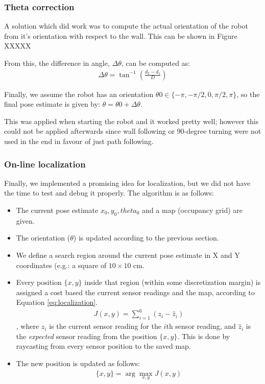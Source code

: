 \subsubsection{Theta correction}
A solution which did work was to compute the actual orientation of the robot from it's orientation with respect to the wall. This can be shown in Figure XXXXX


From this, the difference in angle, $\Delta\theta$, can be computed as:
\begin{align}
\label{eq:locTheta}
\Delta\theta = \tan^{-1}\left(\frac{d_2 - d_1}{D}\right)
\end{align}

Finally, we assume the robot has an orientation $\theta0 \in \{-\pi, -\pi/2, 0, \pi/2, \pi\}$, so the final pose estimate is given by: $\theta = \theta0 + \Delta\theta$.

This was applied when starting the robot and it worked pretty well; however this could not be applied afterwards since wall following or 90-degree turning were not used in the end in favour of just path following.  

\subsubsection{On-line localization}
Finally, we implemented a promising idea for localization, but we did not have the time to test and debug it properly. The algorithm is as follows:

\begin{itemize}
\item The current pose estimate ${x_0, y_0, theta_0}$ and a map (occupancy grid) are given.

\item The orientation ($\theta$) is updated according to the previous section.

\item We define a search region around the current pose estimate in X and Y coordinates (e.g.: a square of $10\times10$ cm.
\item Every position $\{x,y\}$ inside that region (within some discretization margin) is assigned a cost based the current sensor readings and the map, according to Equation \ref{eq:localization}.
\begin{align}
\label{eq:localization}
J(x,y) = \sum_{i = 1}^6 (z_i - \hat{z}_i)
\end{align}
, where $z_i$ is the current sensor reading for the $i$th sensor reading, and $\hat{z}_i$ is the \emph{expected} sensor reading from the position $\{x,y\}$. This is done by raycasting from every sensor position to the saved map.

\item The new position is updated as follows:
\begin{align}
\{x,y\} = \arg\max_{x,y}J(x,y)
\end{align}

\end{itemize}


